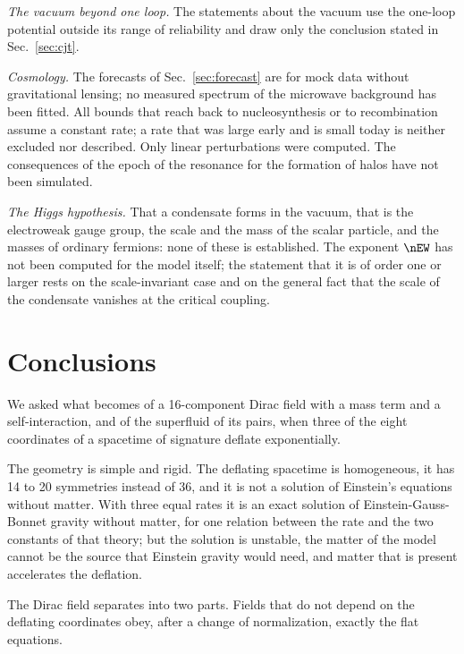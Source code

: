 \emph{The vacuum beyond one loop.} The statements about the vacuum use the one-loop potential
outside its range of reliability and draw only the conclusion stated in Sec.~\ref{sec:cjt}.

\emph{Cosmology.} The forecasts of Sec.~\ref{sec:forecast} are for mock data without gravitational
lensing; no measured spectrum of the microwave background has been fitted. All bounds that reach
back to nucleosynthesis or to recombination assume a constant rate; a rate that was large early and
is small today is neither excluded nor described. Only linear perturbations were computed. The
consequences of the epoch of the resonance for the formation of halos have not been simulated.

\emph{The Higgs hypothesis.} That a
condensate forms in the vacuum, that  is the electroweak gauge group, the scale and the mass of the scalar particle, and the
masses of ordinary fermions: none of these is established. The exponent $\nEW$ has not been computed for the model itself; the
statement that it is of order one or larger rests on the scale-invariant case and on the general
fact that the scale of the condensate vanishes at the critical coupling.

\section{Conclusions}
\label{sec:concl}

We asked what becomes of a 16-component Dirac field with a mass term and a self-interaction, and of
the superfluid of its pairs, when three of the eight coordinates of a spacetime of signature
 deflate exponentially.

The geometry is simple and rigid. The deflating spacetime is homogeneous, it has 14 to 20 symmetries
instead of 36, and it is not a solution of Einstein's equations without matter. With three equal
rates it is an exact solution of Einstein-Gauss-Bonnet gravity without matter, for one relation
between the rate and the two constants of that theory; but the solution is unstable, the matter of
the model cannot be the source that Einstein gravity would need, and matter that is present
accelerates the deflation.

The Dirac field separates into two parts. Fields that do not depend on the deflating coordinates
obey, after a change of normalization, exactly the flat equations.

